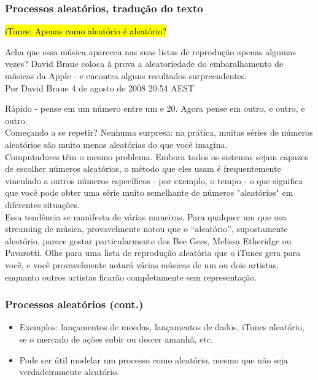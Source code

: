 \begin{frame}
\frametitle{Processos aleatórios, tradução do texto}

\justifying
\hl{iTunes: Apenas como aleatório é aleatório?}\\
\vspace{0.5cm}
\justifying
\tiny{
Acha que essa música apareceu nas suas listas de reprodução apenas algumas vezes? David Braue coloca à prova a aleatoriedade do embaralhamento de músicas da Apple - e encontra alguns resultados surpreendentes.\\
\vspace{0.1cm}
\justifying
Por David Braue 4 de agosto de 2008 20:54 AEST\\
\vspace{0.1cm}

\justifying
Rápido - pense em um número entre um e 20. Agora pense em outro, e outro, e outro.\\

\justifying
Começando a se repetir? Nenhuma surpresa: na prática, muitas séries de números aleatórios são muito menos aleatórias do que você imagina.\\
\justifying
Computadores têm o mesmo problema. Embora todos os sistemas sejam capazes de escolher números aleatórios, o método que eles usam é frequentemente vinculado a outros números específicos - por exemplo, o tempo - o que significa que você pode obter uma série muito semelhante de números "aleatórios" em diferentes situações.\\

\justifying
Essa tendência se manifesta de várias maneiras. Para qualquer um que usa streaming de música, provavelmente notou que o “aleatório”, supostamente aleatório, parece gostar particularmente dos Bee Gees, Melissa Etheridge ou Pavarotti. Olhe para uma lista de reprodução aleatória que o iTunes gera para você, e você provavelmente notará várias músicas de um ou dois artistas, enquanto outros artistas ficarão completamente sem representação.
}
\end{frame}

\begin{frame}
\frametitle{Processos aleatórios (cont.)}

\begin{itemize}
\justifying
\item Exemplos: lançamentos de moedas, lançamentos de dados, iTunes aleatório, se o mercado de ações subir ou descer amanhã, etc.
\justifying
\item Pode ser útil modelar um processo como aleatório, mesmo que não seja verdadeiramente aleatório.

\end{itemize}
\end{frame}

